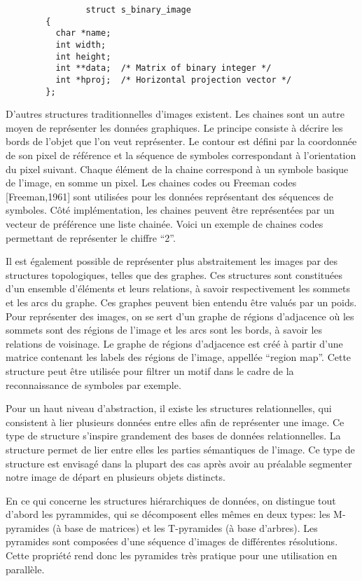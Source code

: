 \documentclass[]{report}
\begin{document}
      \begin{verbatim}
				struct s_binary_image
        {
          char *name;
          int width;
          int height;
          int **data;  /* Matrix of binary integer */
          int *hproj;  /* Horizontal projection vector */
        };
			\end{verbatim}

      D'autres structures traditionnelles d'images existent. Les chaines sont un autre moyen de représenter les données graphiques. Le principe consiste à décrire les bords de l'objet que l'on veut représenter. Le contour est défini par la coordonnée de son pixel de référence et la séquence de symboles correspondant à l'orientation du pixel suivant. Chaque élément de la chaine correspond à un symbole basique de l'image, en somme un pixel. Les chaines codes ou Freeman codes [Freeman,1961] sont utilisées pour les données représentant des séquences de symboles. Côté implémentation, les chaines peuvent être représentées par un vecteur de préférence une liste chainée. Voici un exemple de chaines codes permettant de représenter le chiffre ``2''.



      Il est également possible de représenter plus abstraitement les images par des structures topologiques, telles que des graphes. Ces structures sont constituées d'un ensemble d'éléments et leurs relations, à savoir respectivement les sommets et les arcs du graphe. Ces graphes peuvent bien entendu être valués par un poids. Pour représenter des images, on se sert d'un graphe de régions d'adjacence où les sommets sont des régions de l'image et les arcs sont les bords, à savoir les relations de voisinage. Le graphe de régions d'adjacence est créé à partir d'une matrice contenant les labels des régions de l'image, appellée ``region map''. Cette structure peut être utilisée pour filtrer un motif dans le cadre de la reconnaissance de symboles par exemple.

      Pour un haut niveau d'abstraction, il existe les structures relationnelles, qui consistent à lier plusieurs données entre elles afin de représenter une image. Ce type de structure s'inspire grandement des bases de données relationnelles. La structure permet de lier entre elles les parties sémantiques de l'image. Ce type de structure est envisagé dans la plupart des cas après avoir au préalable segmenter notre image de départ en plusieurs objets distincts.

      
      En ce qui concerne les structures hiérarchiques de données, on distingue tout d'abord les pyrammides, qui se décomposent elles mêmes en deux types: les M-pyramides (à base de matrices) et les T-pyramides (à base d'arbres). Les pyramides sont composées d'une séquence d'images de différentes résolutions. Cette propriété rend donc les pyramides très pratique pour une utilisation en parallèle.
\end{document}
